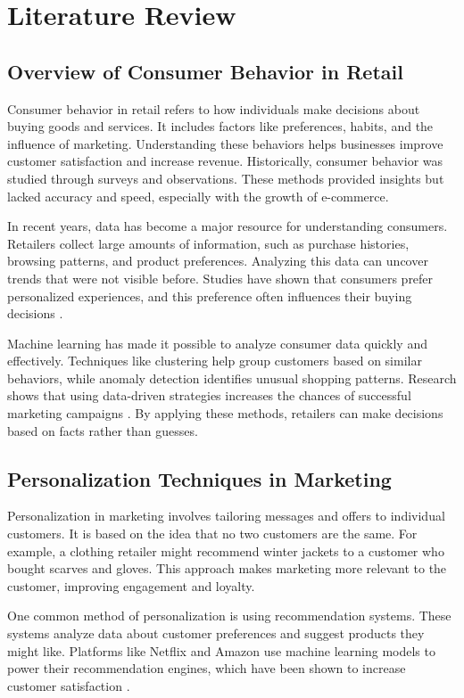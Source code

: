 \documentclass[12pt, a4paper,twoside]{report}
\theoremstyle{plain} %
\theoremstyle{definition} %
\theoremstyle{remark} %
\numberwithin{equation}{chapter}
\begin{document}
\chapter{Literature Review}

\section{Overview of Consumer Behavior in Retail}

Consumer behavior in retail refers to how individuals make decisions about buying goods and services. It includes factors like preferences, habits, and the influence of marketing. Understanding these behaviors helps businesses improve customer satisfaction and increase revenue. Historically, consumer behavior was studied through surveys and observations. These methods provided insights but lacked accuracy and speed, especially with the growth of e-commerce.

In recent years, data has become a major resource for understanding consumers. Retailers collect large amounts of information, such as purchase histories, browsing patterns, and product preferences. Analyzing this data can uncover trends that were not visible before. Studies have shown that consumers prefer personalized experiences, and this preference often influences their buying decisions \cite{smith2021personalization}.

Machine learning has made it possible to analyze consumer data quickly and effectively. Techniques like clustering help group customers based on similar behaviors, while anomaly detection identifies unusual shopping patterns. Research shows that using data-driven strategies increases the chances of successful marketing campaigns \cite{lecun2015deep}. By applying these methods, retailers can make decisions based on facts rather than guesses.

\section{Personalization Techniques in Marketing}

Personalization in marketing involves tailoring messages and offers to individual customers. It is based on the idea that no two customers are the same. For example, a clothing retailer might recommend winter jackets to a customer who bought scarves and gloves. This approach makes marketing more relevant to the customer, improving engagement and loyalty.

One common method of personalization is using recommendation systems. These systems analyze data about customer preferences and suggest products they might like. Platforms like Netflix and Amazon use machine learning models to power their recommendation engines, which have been shown to increase customer satisfaction \cite{kingma2014adam}.
\end{document}
